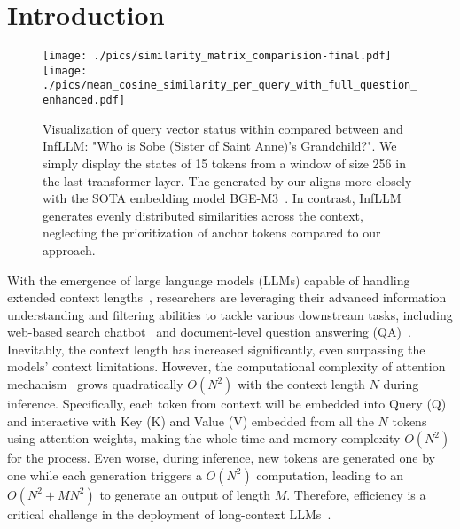 

\section{Introduction}

\begin{figure}[!ht] 
    \centering
        \texttt{[image: ./pics/similarity\_matrix\_comparision-final.pdf]}
        \texttt{[image: ./pics/mean\_cosine\_similarity\_per\_query\_with\_full\_question\_enhanced.pdf]}
    \vspace{-0.2em}
    \caption{Visualization of query vector status within \pq compared between \name and InfLLM: "Who is Sobe (Sister of Saint Anne)’s Grandchild?". We simply display the states of 15 tokens from a window of size 256 in the last transformer layer. The \pq generated by our \name aligns more closely with the SOTA embedding model BGE-M3~\cite{chen-etal-2024-m3}. In contrast, InfLLM generates evenly distributed similarities across the context, neglecting the prioritization of anchor tokens compared to our approach.
    } 
    \vspace{-1em}
    \label{fig:motivation}
\end{figure}

With the emergence of large language models (LLMs) capable of handling extended context lengths~\cite{ wang2024beyond,achiam2023gpt, dubey2024llama}, researchers are leveraging their advanced information understanding and filtering abilities to tackle various downstream tasks, including web-based search chatbot~\cite{Semnani2023WikiChat} and document-level question answering (QA)~\cite{lewis2020retrieval}. 
Inevitably, the context length has increased significantly, even surpassing the models’ context limitations. 
However, the computational complexity of attention mechanism~\cite{vaswani2017attention} grows quadratically $O(N^2)$ with the context length $N$ during inference. Specifically, each token from context will be embedded into Query (Q) and interactive with Key (K) and Value (V) embedded from all the $N$ tokens using attention weights, making the whole time and memory complexity $O(N^2)$ for the process.
Even worse, during inference, new tokens are generated one by one while each generation triggers a $O(N^2)$ computation, leading to an $O(N^2+MN^2)$ to generate an output of length $M$.
Therefore, efficiency is a critical challenge in the deployment of long-context LLMs~\cite{li2024survey}.



